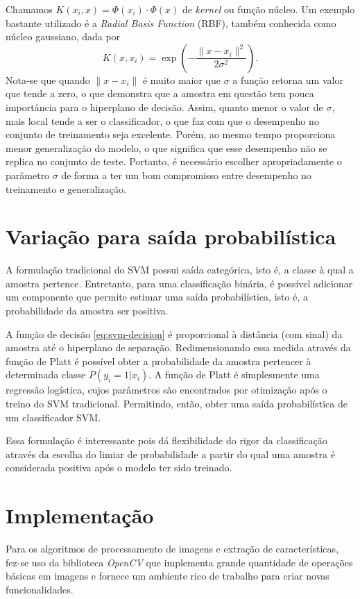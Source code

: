 Chamamos $K(x_i, x) = \Phi(x_i) \cdot \Phi(x)$ de \textit{kernel} ou função núcleo. Um exemplo bastante utilizado é a \textit{Radial Basis Function} (RBF), também conhecida como núcleo gaussiano, dada por
\begin{equation}
	\label{eq:svm-kernel-func}
	K(x,x_i) = \exp\left(-\frac{\|x-x_i\|^2}{2\sigma^2}\right).
\end{equation}
Nota-se que quando $\|x-x_i\|$ é muito maior que $\sigma$ a função retorna um valor que tende a zero, o que demonstra que a amostra em questão tem pouca importância para o hiperplano de decisão. Assim, quanto menor o valor de $\sigma$, mais local tende a ser o classificador, o que faz com que o desempenho no conjunto de treinamento seja excelente. Porém, ao mesmo tempo proporciona menor generalização do modelo, o que significa que esse desempenho não se replica no conjunto de teste. Portanto, é necessário escolher apropriadamente o parâmetro $\sigma$ de forma a ter um bom compromisso entre desempenho no treinamento e generalização.

\section{Variação para saída probabilística}
\label{sec:svm-probabilistic}
A formulação tradicional do SVM possui saída categórica, isto é, a classe à qual a amostra pertence. Entretanto, para uma classificação binária, é possível adicionar um componente que permite estimar uma saída probabilística, isto é, a probabilidade da amostra ser positiva.

A função de decisão \eqref{eq:svm-decision} é proporcional à distância (com sinal) da amostra até o hiperplano de separação. Redimensionando essa medida através da função de Platt \cite{svmProbabilisticOutput} é possível obter a probabilidade da amostra pertencer à determinada classe $P(y_i=1 | x_i)$. A função de Platt é simplesmente uma regressão logística, cujos parâmetros são encontrados por otimização após o treino do SVM tradicional. Permitindo, então, obter uma saída probabilística de um classificador SVM.

Essa formulação é interessante pois dá flexibilidade do rigor da classificação através da escolha do limiar de probabilidade a partir do qual uma amostra é considerada positiva após o modelo ter sido treinado.

\section{Implementação}
Para os algoritmos de processamento de imagens e extração de características, fez-se uso da biblioteca \textit{OpenCV} que implementa grande quantidade de operações básicas em imagens e fornece um ambiente rico de trabalho para criar novas funcionalidades.

